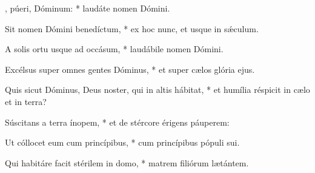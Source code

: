 \begin{psalmus}

    , púeri, Dóminum: * laudáte nomen Dómini.

    Sit nomen Dómini benedíctum, * ex hoc nunc, et usque in sǽculum.

    A solis ortu usque ad occásum, * laudábile nomen Dómini.

    Excélsus super omnes gentes Dóminus, * et super cælos glória ejus.

    Quis sicut Dóminus, Deus noster, qui in altis hábitat, * et humília réspicit in cælo et in terra?

    Súscitans a terra ínopem, * et de stércore érigens páuperem:

    Ut cóllocet eum cum princípibus, * cum princípibus pópuli sui.

    Qui habitáre facit stérilem in domo, * matrem filiórum lætántem.

\end{psalmus}
